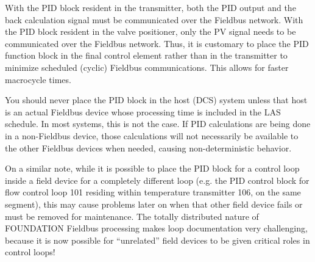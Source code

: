 With the PID block resident in the transmitter, both the PID output and the back calculation signal must be communicated over the Fieldbus network.  With the PID block resident in the valve positioner, only the PV signal needs to be communicated over the Fieldbus network.  Thus, it is customary to place the PID function block in the final control element rather than in the transmitter to minimize scheduled (cyclic) Fieldbus communications.  This allows for faster macrocycle times.

\vskip 10pt

You should never place the PID block in the host (DCS) system unless that host is an actual Fieldbus device whose processing time is included in the LAS schedule.  In most systems, this is not the case.  If PID calculations are being done in a non-Fieldbus device, those calculations will not necessarily be available to the other Fieldbus devices when needed, causing non-deterministic behavior.

\vskip 10pt

On a similar note, while it is possible to place the PID block for a control loop inside a field device for a completely different loop (e.g. the PID control block for flow control loop 101 residing within temperature transmitter 106, on the same segment), this may cause problems later on when that other field device fails or must be removed for maintenance.  The totally distributed nature of FOUNDATION Fieldbus processing makes loop documentation very challenging, because it is now possible for ``unrelated'' field devices to be given critical roles in control loops!











